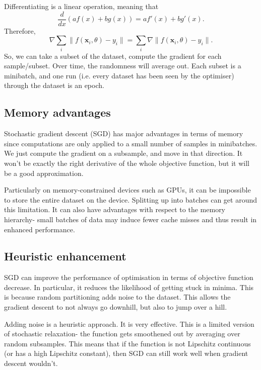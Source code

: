 \documentclass[a4paper, openany]{memoir}
\begin{document}
Differentiating is a linear operation, meaning that
\[\frac{d}{dx}(a f(x) + bg(x)) = af'(x) + bg'(x).\]
Therefore,
\[\nabla \sum_i \lVert f(\mathbf{x}_i, \theta) - y_i \rVert = \sum_i \nabla \lVert f(\mathbf{x}_i, \theta) - y_i \rVert.\]
So, we can take a subset of the dataset, compute the gradient for each sample/subset. Over time, the randomness will average out. Each subset is a minibatch, and one run (i.e. every dataset has been seen by the optimiser) through the dataset is an epoch.

\subsection{Memory advantages}
Stochastic gradient descent (SGD) has major advantages in terms of memory since computations are only applied to a small number of samples in minibatches. We just compute the gradient on a subsample, and move in that direction. It won't be exactly the right derivative of the whole objective function, but it will be a good approximation.

Particularly on memory-constrained devices such as GPUs, it can be impossible to store the entire dataset on the device. Splitting up into batches can get around this limitation. It can also have advantages with respect to the memory hierarchy- small batches of data may induce fewer cache misses and thus result in enhanced performance.

\subsection{Heuristic enhancement}
SGD can improve the performance of optimisation in terms of objective function decrease. In particular, it reduces the likelihood of getting stuck in minima. This is because random partitioning adds noise to the dataset. This allows the gradient descent to not always go downhill, but also to jump over a hill.

Adding noise is a heuristic approach. It is very effective. This is a limited version of stochastic relaxation- the function gets smoothened out by averaging over random subsamples. This means that if the function is not Lipschitz continuous (or has a high Lipschitz constant), then SGD can still work well when gradient descent wouldn't.
\end{document}
